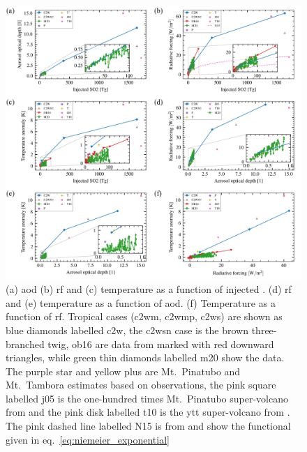 \documentclass{ametsocV6.1}
\newcommand{\iso}[1][i]{{#1}njected \ce{SO2}}
\begin{document}
\begin{figure}
  \centering
  \includegraphics[width=0.95\linewidth]{figures/parameter_scan.png}

  \caption{(a) \gls{aod} (b) \gls{rf} and (c) temperature as a function of \iso{}\@. (d)
    \gls{rf} and (e) temperature as a function of \gls{aod}. (f) Temperature as a function
    of \gls{rf}. Tropical cases (\gls{c2wm}, \gls{c2wmp}, \gls{c2ws}) are shown as blue
    diamonds labelled \gls{c2w}, the \gls{c2wsn} case is the brown three-branched twig,
    \gls{ob16} are data from \citet{ottobliesner2016} marked with red downward triangles,
    while green thin diamonds labelled \gls{m20} show the \citet{marshall2020dataset} data.
    The purple star and yellow plus are Mt.\ Pinatubo and Mt.\ Tambora estimates based on
    observations, the pink square labelled \gls{j05} is the one-hundred times Mt.\ Pinatubo
    super-volcano from \citet{jones2005} and the pink disk labelled \gls{t10} is the
    \gls{ytt} super-volcano from \citet{timmreck2010}. The pink dashed line labelled N15 is
    from \citet{niemeier2015} and show the functional given in
    eq.~\ref{eq:niemeier_exponential}}\label{fig:parameter_scan}%
\end{figure}
\end{document}
